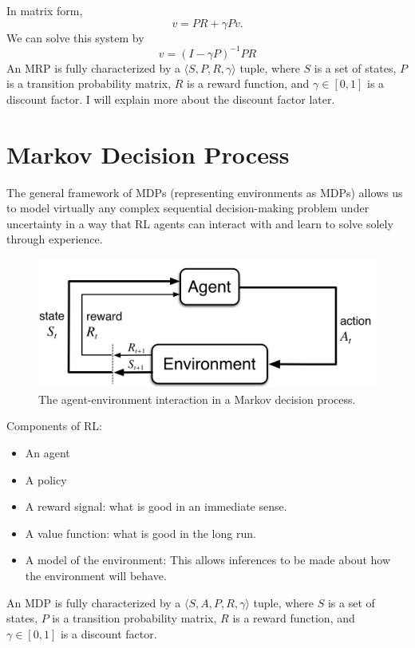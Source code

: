 In matrix form,
$$v = PR+\gamma Pv.$$
We can solve this system by
$$v = (I-\gamma P)^{-1}PR$$
An MRP is fully characterized by a $\langle S,P,R,\gamma \rangle$ tuple, where $S$ is a set of states, $P$ is a transition probability matrix, $R$ is a reward function, and $\gamma\in[0,1]$  is a discount factor. I will explain more about the discount factor later. 


\section{Markov Decision Process}

The general framework of MDPs (representing environments as MDPs) allows us to model virtually any complex sequential decision-making problem under uncertainty in a way that RL agents can interact with and learn to solve solely through experience. 

\begin{figure}[h]
	\centering
	\includegraphics[scale=0.3]{./images/mdp.png}
	\caption{The agent-environment interaction in a Markov decision process.}
	\label{fig:mdp_ill}
\end{figure}

Components of RL:
\begin{itemize}
	\item An agent
	\item A policy
	\item A reward signal: what is good in an immediate sense.
	\item A value function: what is good in the long run.
	\item A model of the environment: This allows inferences to be made about how the environment will behave.
\end{itemize}
An MDP is fully characterized by a $\langle S,A,P,R,\gamma \rangle$ tuple, where $S$ is a set of states, $P$ is a transition probability matrix, $R$ is a reward function, and $\gamma\in[0,1]$  is a discount factor.

